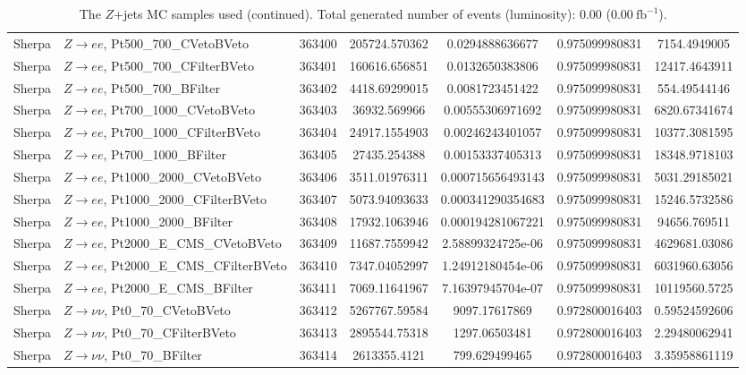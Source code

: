 \begin{table}[h]
\begin{center}
\begin{tabular}{|l|l|c|
S[table-parse-only, round-precision=4]|
S[table-parse-only, round-precision=3]|
S[table-parse-only, round-precision=3]|
S[table-parse-only, round-precision=3]|
}
Sherpa & $Z\rightarrow ee$, Pt500\_700\_CVetoBVeto & 363400 & 205724.570362 & 0.0294888636677 & 0.975099980831 & 7154.4949005 \\
Sherpa & $Z\rightarrow ee$, Pt500\_700\_CFilterBVeto & 363401 & 160616.656851 & 0.0132650383806 & 0.975099980831 & 12417.4643911 \\
Sherpa & $Z\rightarrow ee$, Pt500\_700\_BFilter & 363402 & 4418.69299015 & 0.0081723451422 & 0.975099980831 & 554.49544146 \\
Sherpa & $Z\rightarrow ee$, Pt700\_1000\_CVetoBVeto & 363403 & 36932.569966 & 0.00555306971692 & 0.975099980831 & 6820.67341674 \\
Sherpa & $Z\rightarrow ee$, Pt700\_1000\_CFilterBVeto & 363404 & 24917.1554903 & 0.00246243401057 & 0.975099980831 & 10377.3081595 \\
Sherpa & $Z\rightarrow ee$, Pt700\_1000\_BFilter & 363405 & 27435.254388 & 0.00153337405313 & 0.975099980831 & 18348.9718103 \\
Sherpa & $Z\rightarrow ee$, Pt1000\_2000\_CVetoBVeto & 363406 & 3511.01976311 & 0.000715656493143 & 0.975099980831 & 5031.29185021 \\
Sherpa & $Z\rightarrow ee$, Pt1000\_2000\_CFilterBVeto & 363407 & 5073.94093633 & 0.000341290354683 & 0.975099980831 & 15246.5732586 \\
Sherpa & $Z\rightarrow ee$, Pt1000\_2000\_BFilter & 363408 & 17932.1063946 & 0.000194281067221 & 0.975099980831 & 94656.769511 \\
Sherpa & $Z\rightarrow ee$, Pt2000\_E\_CMS\_CVetoBVeto & 363409 & 11687.7559942 & 2.58899324725e-06 & 0.975099980831 & 4629681.03086 \\
Sherpa & $Z\rightarrow ee$, Pt2000\_E\_CMS\_CFilterBVeto & 363410 & 7347.04052997 & 1.24912180454e-06 & 0.975099980831 & 6031960.63056 \\
Sherpa & $Z\rightarrow ee$, Pt2000\_E\_CMS\_BFilter & 363411 & 7069.11641967 & 7.16397945704e-07 & 0.975099980831 & 10119560.5725 \\
Sherpa & $Z\rightarrow\nu\nu$, Pt0\_70\_CVetoBVeto & 363412 & 5267767.59584 & 9097.17617869 & 0.972800016403 & 0.59524592606 \\
Sherpa & $Z\rightarrow\nu\nu$, Pt0\_70\_CFilterBVeto & 363413 & 2895544.75318 & 1297.06503481 & 0.972800016403 & 2.29480062941 \\
Sherpa & $Z\rightarrow\nu\nu$, Pt0\_70\_BFilter & 363414 & 2613355.4121 & 799.629499465 & 0.972800016403 & 3.35958861119 \\
\bottomrule
\end{tabular}
\caption{The $Z$+jets MC samples used (continued). Total generated number of events (luminosity): 0.00 (0.00$~\mathrm{fb}^{-1}$).}
\label{tab:app:datamcZ_sherpa_220}
\end{center}
\end{table}
